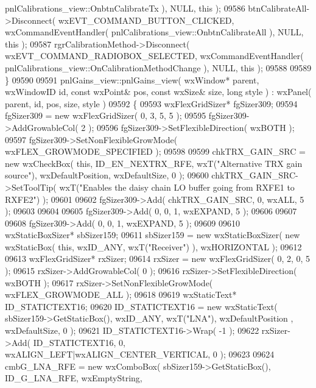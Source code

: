 \begin{DoxyCode}
      pnlCalibrations_view::OnbtnCalibrateTx ), NULL, \textcolor{keyword}{this} );
09586     btnCalibrateAll->Disconnect( wxEVT\_COMMAND\_BUTTON\_CLICKED, wxCommandEventHandler( 
      pnlCalibrations_view::OnbtnCalibrateAll ), NULL, \textcolor{keyword}{this} );
09587     rgrCalibrationMethod->Disconnect( wxEVT\_COMMAND\_RADIOBOX\_SELECTED, wxCommandEventHandler( 
      pnlCalibrations_view::OnCalibrationMethodChange ), NULL, \textcolor{keyword}{this} );
09588     
09589 \}
09590 
09591 pnlGains_view::pnlGains_view( wxWindow* parent, wxWindowID \textcolor{keywordtype}{id}, \textcolor{keyword}{const} wxPoint& pos, \textcolor{keyword}{const} wxSize& 
      size, \textcolor{keywordtype}{long} style ) : wxPanel( parent, id, pos, size, style )
09592 \{
09593     wxFlexGridSizer* fgSizer309;
09594     fgSizer309 = \textcolor{keyword}{new} wxFlexGridSizer( 0, 3, 5, 5 );
09595     fgSizer309->AddGrowableCol( 2 );
09596     fgSizer309->SetFlexibleDirection( wxBOTH );
09597     fgSizer309->SetNonFlexibleGrowMode( wxFLEX\_GROWMODE\_SPECIFIED );
09598     
09599     chkTRX_GAIN_SRC = \textcolor{keyword}{new} wxCheckBox( \textcolor{keyword}{this}, ID_EN_NEXTRX_RFE, wxT(\textcolor{stringliteral}{"Alternative TRX gain source"}), 
      wxDefaultPosition, wxDefaultSize, 0 );
09600     chkTRX_GAIN_SRC->SetToolTip( wxT(\textcolor{stringliteral}{"Enables the daisy chain LO buffer going from RXFE1  to RXFE2"}) );
09601     
09602     fgSizer309->Add( chkTRX_GAIN_SRC, 0, wxALL, 5 );
09603     
09604     
09605     fgSizer309->Add( 0, 0, 1, wxEXPAND, 5 );
09606     
09607     
09608     fgSizer309->Add( 0, 0, 1, wxEXPAND, 5 );
09609     
09610     wxStaticBoxSizer* sbSizer159;
09611     sbSizer159 = \textcolor{keyword}{new} wxStaticBoxSizer( \textcolor{keyword}{new} wxStaticBox( \textcolor{keyword}{this}, wxID\_ANY, wxT(\textcolor{stringliteral}{"Receiver"}) ), wxHORIZONTAL );
09612     
09613     wxFlexGridSizer* rxSizer;
09614     rxSizer = \textcolor{keyword}{new} wxFlexGridSizer( 0, 2, 0, 5 );
09615     rxSizer->AddGrowableCol( 0 );
09616     rxSizer->SetFlexibleDirection( wxBOTH );
09617     rxSizer->SetNonFlexibleGrowMode( wxFLEX\_GROWMODE\_ALL );
09618     
09619     wxStaticText* ID\_STATICTEXT16;
09620     ID\_STATICTEXT16 = \textcolor{keyword}{new} wxStaticText( sbSizer159->GetStaticBox(), wxID\_ANY, wxT(\textcolor{stringliteral}{"LNA"}), wxDefaultPosition
      , wxDefaultSize, 0 );
09621     ID\_STATICTEXT16->Wrap( -1 );
09622     rxSizer->Add( ID\_STATICTEXT16, 0, wxALIGN\_LEFT|wxALIGN\_CENTER\_VERTICAL, 0 );
09623     
09624     cmbG_LNA_RFE = \textcolor{keyword}{new} wxComboBox( sbSizer159->GetStaticBox(), ID_G_LNA_RFE, wxEmptyString, 

\end{DoxyCode}
